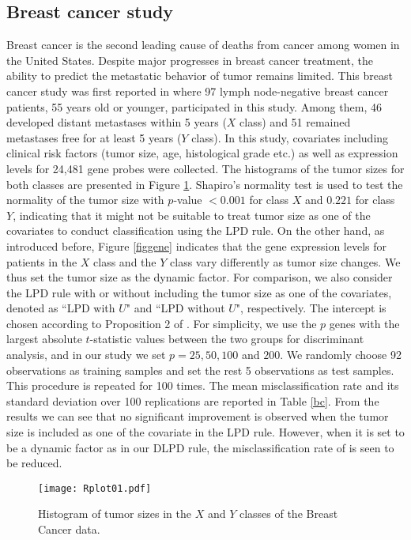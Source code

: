 \documentclass[11pt]{article}
\theoremstyle{definition}
\begin{document}
 \subsection{Breast cancer study}
 Breast cancer is the second leading cause of deaths from cancer among women in the United States. Despite major progresses in breast cancer treatment, the ability to predict the metastatic behavior of tumor remains limited. This breast cancer study was first reported in \cite{van2002gene} where 97 lymph node-negative breast cancer patients, 55 years old or younger, participated in this study. Among them, 46 developed distant metastases within 5 years ($X$ class) and 51 remained metastases free for at least 5 years ($Y$ class). In this study, covariates including clinical risk factors (tumor size, age, histological grade etc.)  as well as expression levels for 24,481 gene probes were collected. The histograms of the tumor sizes for both classes are presented in Figure \ref{figts}. Shapiro's normality test is used to test the normality of the tumor size with $p$-value $<0.001$ for class $X$ and $0.221$ for class $Y$, indicating that it might not be suitable to treat tumor size as one of the covariates to conduct classification using the LPD rule.
 On the other hand, as introduced before, Figure \ref{figgene} indicates that the gene expression levels for patients in the $X$ class and the $Y$ class vary differently as tumor size changes. We thus set the tumor size as the dynamic factor. For comparison, we also consider the LPD rule with or without including the tumor size as one of the covariates, denoted as ``LPD with $U$" and ``LPD without $U$", respectively. The intercept is chosen according to Proposition 2 of \cite{Maiqing2012}. For simplicity, we use the $p$ genes with the largest absolute $t$-statistic values between the two groups for discriminant analysis, and in our study we set $p=25, 50, 100$ and $200$. We randomly choose 92 observations as training samples and set the rest 5 observations as test samples. This procedure is repeated for 100 times. The mean misclassification rate and its standard deviation over 100 replications are reported in Table \ref{bc}. From the results we can see that no significant improvement is observed when the tumor size is included as one of the covariate in the LPD rule. However, when it is set to be a dynamic factor as in our DLPD rule, the misclassification rate of is seen to be reduced. 
 \begin{figure}[htbp]
 	\centering
 	\texttt{[image: Rplot01.pdf]}
 	\caption{Histogram of  tumor sizes in the $X$ and $Y$ classes of the Breast Cancer data.}\label{figts}
 \end{figure}
 
\end{document}
